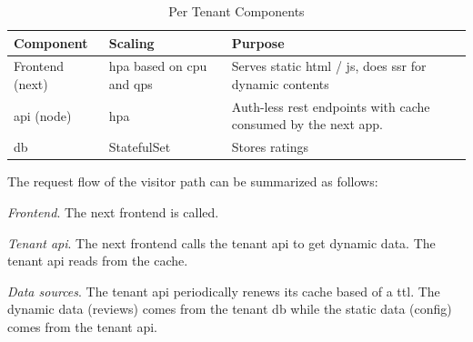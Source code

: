 \documentclass[11pt, a4paper, oneside, listof=totoc]{scrartcl}
\begin{document}
                \begin{table}[H]
                    \centering
                    \renewcommand{\arraystretch}{1.5}
                    \begin{tabular}{lp{4cm}P{8cm}}
                        \toprule
                        Component & Scaling & Purpose \\
                        \midrule
                        Frontend (\gls{next}) & \gls{hpa} based on \gls{cpu} and \gls{qps} & Serves static \gls{html} / \gls{js}, does \gls{ssr} for dynamic contents \\
                        \gls{api} (\gls{node}) & \gls{hpa} & Auth-less \gls{rest} endpoints with cache consumed by the \gls{next} app. \\
                        \gls{db} & StatefulSet & Stores ratings \\
                        \bottomrule
                    \end{tabular}
                    \caption{Per Tenant Components}\label{tab:tenantComponents}
                \end{table}

                The request flow of the visitor path can be summarized as follows:

                \begin{enumerate}[label={[\arabic*]:},
                    ref=Challenge~\arabic*,
                    leftmargin=*,
                    itemsep=0.6\baselineskip]

                    \item\label{chal:frontend}
                        \textit{Frontend}.
                        The \gls{next} frontend is called.
                    \item\label{chal:tenantApi}
                        \textit{Tenant \gls{api}}.
                        The \gls{next} frontend calls the tenant \gls{api} to get dynamic data.
                        The tenant \gls{api} reads from the cache.

                    \item\label{chal:db}
                        \textit{Data sources}.
                        The tenant \gls{api} periodically renews its cache based of a \gls{ttl}.
                        The dynamic data (reviews) comes from the tenant \gls{db} while the static
                        data (config) comes from the tenant \gls{api}.
                \end{enumerate}
\end{document}

